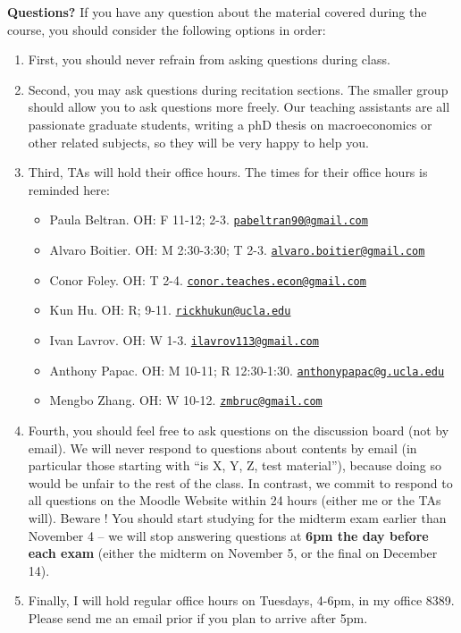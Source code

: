 \documentclass[]{book}
\providecommand{\tightlist}{%
  \setlength{\itemsep}{0pt}\setlength{\parskip}{0pt}}
\theoremstyle{definition}
\theoremstyle{definition}
\theoremstyle{definition}
\theoremstyle{remark}
\begin{document}
\textbf{Questions?} If you have any question about the material covered
during the course, you should consider the following options in order:

\begin{enumerate}
\def\labelenumi{\arabic{enumi}.}
\item
  First, you should never refrain from asking questions during class.
\item
  Second, you may ask questions during recitation sections. The smaller
  group should allow you to ask questions more freely. Our teaching
  assistants are all passionate graduate students, writing a phD thesis
  on macroeconomics or other related subjects, so they will be very
  happy to help you.
\item
  Third, TAs will hold their office hours. The times for their office
  hours is reminded here:

  \begin{itemize}
  \tightlist
  \item
    Paula Beltran. OH: F 11-12; 2-3.
    \href{mailto:pabeltran90@gmail.com}{\nolinkurl{pabeltran90@gmail.com}}
  \item
    Alvaro Boitier. OH: M 2:30-3:30; T 2-3.
    \href{mailto:alvaro.boitier@gmail.com}{\nolinkurl{alvaro.boitier@gmail.com}}
  \item
    Conor Foley. OH: T 2-4.
    \href{mailto:conor.teaches.econ@gmail.com}{\nolinkurl{conor.teaches.econ@gmail.com}}
  \item
    Kun Hu. OH: R; 9-11.
    \href{mailto:rickhukun@ucla.edu}{\nolinkurl{rickhukun@ucla.edu}}
  \item
    Ivan Lavrov. OH: W 1-3.
    \href{mailto:ilavrov113@gmail.com}{\nolinkurl{ilavrov113@gmail.com}}
  \item
    Anthony Papac. OH: M 10-11; R 12:30-1:30.
    \href{mailto:anthonypapac@g.ucla.edu}{\nolinkurl{anthonypapac@g.ucla.edu}}
  \item
    Mengbo Zhang. OH: W 10-12.
    \href{mailto:zmbruc@gmail.com}{\nolinkurl{zmbruc@gmail.com}}
  \end{itemize}
\item
  Fourth, you should feel free to ask questions on the discussion board
  (not by email). We will never respond to questions about contents by
  email (in particular those starting with ``is X, Y, Z, test
  material''), because doing so would be unfair to the rest of the
  class. In contrast, we commit to respond to all questions on the
  Moodle Website within 24 hours (either me or the TAs will). Beware !
  You should start studying for the midterm exam earlier than November 4
  -- we will stop answering questions at \textbf{6pm the day before each
  exam} (either the midterm on November 5, or the final on December 14).
\item
  Finally, I will hold regular office hours on Tuesdays, 4-6pm, in my
  office 8389. Please send me an email prior if you plan to arrive after
  5pm.
\end{enumerate}
\end{document}
